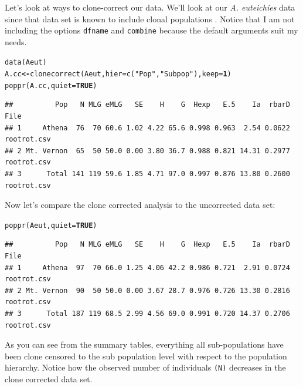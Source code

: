 \documentclass[letterpaper]{article}\usepackage[]{graphicx}\usepackage[]{color}
\makeatletter
\newcommand{\hlnum}[1]{\textcolor[rgb]{0.502,0,0.502}{\textbf{#1}}}%
\newcommand{\hlstr}[1]{\textcolor[rgb]{0.651,0.522,0}{#1}}%
\newcommand{\hlstd}[1]{\textcolor[rgb]{0,0,0}{#1}}%
\newcommand{\hlkwb}[1]{\textcolor[rgb]{0.502,0.502,0.753}{\textbf{#1}}}%
\newcommand{\hlkwc}[1]{\textcolor[rgb]{0,0.502,0.753}{#1}}%
\newcommand{\hlkwd}[1]{\textcolor[rgb]{0,0.267,0.4}{#1}}%
\newenvironment{kframe}{%
 \def\at@end@of@kframe{}%
 \ifinner\ifhmode%
  \def\at@end@of@kframe{\end{minipage}}%
  \begin{minipage}{\columnwidth}%
 \fi\fi%
 \def\FrameCommand##1{\hskip\@totalleftmargin \hskip-\fboxsep
 \colorbox{shadecolor}{##1}\hskip-\fboxsep
     \hskip-\linewidth \hskip-\@totalleftmargin \hskip\columnwidth}%
 \MakeFramed {\advance\hsize-\width
   \@totalleftmargin\z@ \linewidth\hsize
   \@setminipage}}%
 {\par\unskip\endMakeFramed%
 \at@end@of@kframe}
\newenvironment{knitrout}{}{} %
\makeatother
\begin{document}
Let's look at ways to clone-correct our data. We'll look at our \textit{A. euteichies} data since that data set is known to include clonal populations \cite{Grunwald:2006}. Notice that I am not including the options \texttt{dfname} and \texttt{combine} because the default arguments suit my needs.
\begin{knitrout}\footnotesize
{}\color{fgcolor}\begin{kframe}
\begin{alltt}
\hlkwd{data}\hlstd{(Aeut)}
\hlstd{A.cc} \hlkwb{<-} \hlkwd{clonecorrect}\hlstd{(Aeut,} \hlkwc{hier} \hlstd{=} \hlkwd{c}\hlstd{(}\hlstr{"Pop"}\hlstd{,} \hlstr{"Subpop"}\hlstd{),} \hlkwc{keep} \hlstd{=} \hlnum{1}\hlstd{)}
\hlkwd{poppr}\hlstd{(A.cc,} \hlkwc{quiet} \hlstd{=} \hlnum{TRUE}\hlstd{)}
\end{alltt}
\begin{verbatim}
##          Pop   N MLG eMLG   SE    H    G  Hexp   E.5    Ia  rbarD        File
## 1     Athena  76  70 60.6 1.02 4.22 65.6 0.998 0.963  2.54 0.0622 rootrot.csv
## 2 Mt. Vernon  65  50 50.0 0.00 3.80 36.7 0.988 0.821 14.31 0.2977 rootrot.csv
## 3      Total 141 119 59.6 1.85 4.71 97.0 0.997 0.876 13.80 0.2600 rootrot.csv
\end{verbatim}
\end{kframe}
\end{knitrout}

Now let's compare the clone corrected analysis to the uncorrected data set:
\begin{knitrout}\footnotesize
{}\color{fgcolor}\begin{kframe}
\begin{alltt}
\hlkwd{poppr}\hlstd{(Aeut,} \hlkwc{quiet} \hlstd{=} \hlnum{TRUE}\hlstd{)}
\end{alltt}
\begin{verbatim}
##          Pop   N MLG eMLG   SE    H    G  Hexp   E.5    Ia  rbarD        File
## 1     Athena  97  70 66.0 1.25 4.06 42.2 0.986 0.721  2.91 0.0724 rootrot.csv
## 2 Mt. Vernon  90  50 50.0 0.00 3.67 28.7 0.976 0.726 13.30 0.2816 rootrot.csv
## 3      Total 187 119 68.5 2.99 4.56 69.0 0.991 0.720 14.37 0.2706 rootrot.csv
\end{verbatim}
\end{kframe}
\end{knitrout}


As you can see from the summary tables, everything all sub-populations have been clone censored to the sub population level with respect to the population hierarchy. Notice how the observed number of individuals \texttt{(N)} decreases in the clone corrected data set.
\end{document}
